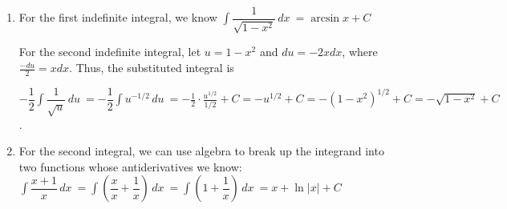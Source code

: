 \documentclass{article}
\begin{document}
\begin{enumerate}
\begin{enumerate}
\begin{enumerate}
\begin{solution}
         For the second indefinite integral, let $u=1+x^2$ and $du=2xdx$, where $\frac{du}{2}=xdx$. Thus, the substituted integral is

         $\dfrac{1}{2} \displaystyle \int \dfrac{1}{u}\,du\ =\frac{1}{2}\ln |u| + C = \frac{1}{2}\ln |1+x^2| + C =\frac{1}{2}\ln (1+x^2) + C$.
         
        \end{solution}
        \end{enumerate}
    \pspace{\vfill}\item
        \begin{enumerate}
        \begin{solution}
         For the first indefinite integral, we know $\displaystyle \int \dfrac{1}{\sqrt{1-x^2}}\,dx\ =\arcsin x + C$ \newline

         For the second indefinite integral, let $u=1-x^2$ and $du=-2xdx$, where $\frac{-du}{2}=xdx$. Thus, the substituted integral is

         $-\dfrac{1}{2} \displaystyle \int \dfrac{1}{\sqrt{u}}\,du\ = -\dfrac{1}{2} \displaystyle \int u^{-1/2}\,du\ = -\frac{1}{2}\cdot\frac{u^{1/2}}{1/2} + C = -u^{1/2} + C =-(1-x^2)^{1/2} + C = -\sqrt{1-x^2}+C$.
         
        \end{solution}
        \end{enumerate}
    \pspace{\vfill}
    \pspace{\newpage}
    \item
        \begin{enumerate}
        \begin{solution}
            For the second integral, we can use algebra to break up the integrand into two functions whose antiderivatives we know: \newline\newline
            $\displaystyle \int \dfrac{x+1}{x}\,dx\ = \displaystyle \int \left(\dfrac{x}{x}+\dfrac{1}{x}\right)\,dx\ = \displaystyle \int \left(1+\dfrac{1}{x}\right)\,dx\ =x + \ln |x| +C$


\end{solution}
\end{enumerate}
\end{enumerate}
\end{enumerate}
\end{document}
